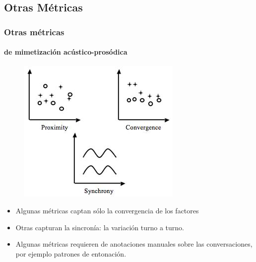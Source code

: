 
\subsection{Otras Métricas }

\begin{frame}
  \frametitle{Otras métricas}
  \framesubtitle{de mimetización acústico-prosódica}

  \begin{figure}
    \includegraphics[scale=0.40]{images/types_of_entrainment.jpg}
  \end{figure}

  \begin{itemize}
    \item Algunas métricas captan sólo la convergencia de los factores
    \item Otras capturan la sincronía: la variación turno a turno.
    \item Algunas métricas requieren de anotaciones manuales sobre las conversaciones, por ejemplo patrones de entonación.
  \end{itemize}

\end{frame}


